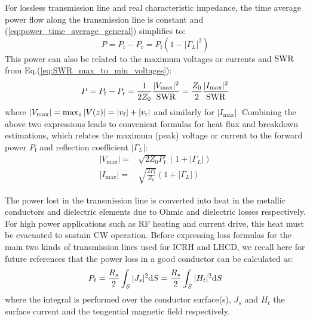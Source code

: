 For lossless transmission line and real characteristic impedance, the time average power flow along the transmission line is constant and (\ref{eq:power_time_average_general}) simplifies to:
\begin{equation}
P = P_\mathrm{f} - P_\mathrm{r} = P_\mathrm{f} \left(1 - |\Gamma_L|^2\right)
\label{eq:power_loss_lossless_transmission_line}
\end{equation}
This power can also be related to the maximum voltages or currents and ${\mathrm{SWR}}$ from Eq.(\ref{eq:SWR_max_to_min_voltages}):
\begin{equation}
P = P_\mathrm{f} - P_\mathrm{r} = \frac{1}{2 Z_0} \frac{	|V_{\mathrm{max}}|^2}{{\mathrm{SWR}}} = \frac{Z_0}{2} \frac{|I_{\mathrm{max}}|^2}{{\mathrm{SWR}}}
\label{eq:power_loss_lossless_transmission_line_maxvoltage_maxcurrent}
\end{equation}
where $|V_{\mathrm{max}}| = \max_z |V(z)| = |{v_{\mathrm{f}}}| + |{v_{\mathrm{r}}}|$ and similarly for $|I_\mathrm{max}|$. Combining the above two expressions leads to convenient formulas for heat flux and breakdown estimations, which relates the maximum (peak) voltage or current to the forward power $P_\mathrm{f}$ and reflection coefficient $|\Gamma_L|$:
\begin{subequations}
	\begin{align}
		|V_\mathrm{max}| =& \sqrt{2 Z_0 P_\mathrm{f} } \left(1 + |\Gamma_L| \right) \\
		|I_\mathrm{max}| =& \sqrt{\frac{2 P_\mathrm{f}}{Z_0} } \left(1 + |\Gamma_L| \right)
	\end{align}
	\label{eq:max_current_function_forward_power_gammaL}
\end{subequations}

The power lost in the transmission line is converted into heat in the metallic conductors and dielectric elements due to Ohmic and dielectric losses respectively. For high power applications such as RF heating and current drive, this heat must be evacuated to sustain CW operation. Before expressing loss formulas for the main two kinds of transmission lines used for ICRH and LHCD, we recall here for future references that the power loss in a good conductor can be calculated as:
\begin{equation}
P_\ell = \frac{R_s}{2} \int_S |J_s|^2 {\mathrm{d}} S = \frac{R_s}{2} \int_S |H_t|^2 {\mathrm{d}} S 
\label{eq:power_loss_conductor}
\end{equation}
where the integral is performed over the conductor surface(s), $J_s$ and $H_t$ the surface current and the tengential magnetic field respectively\cite[§1.7]{pozar2012}. 

